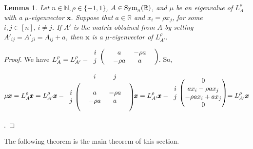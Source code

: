 \documentclass{amsart}
\newtheorem{lemma}[theorem]{Lemma}
\theoremstyle{remark}
\begin{document}
\begin{lemma}\label{edgeprin2}
Let  $n\in \mathbb{N}, \rho\in \{-1,1\}$, $A\in \text{\rm Sym}_{n}(\mathbb{R})$, and $\mu$ be  an  eigenvalue  of  $L_{A}^{\rho}$  with a $\mu$-eigenvector  $\pmb{x}$. Suppose that $a\in \mathbb{R}$ and  $x_{i}=\rho x_{j}$, for some $i,j\in [n],\, i\neq j$. If $A'$  is the  matrix  obtained  from  $A$ by setting  $A'_{ij}=A'_{ji}=A_{ij}+a$,  then $\pmb{x}$ is a $\mu$-eigenvector   of  $L_{A'}^{\rho}$.
\end{lemma} 
\begin{proof}
We have {\footnotesize ${L_{A}^{\rho}}=
{L_{A'}^{\rho}}-
\begin{blockarray}{ccccc}
\begin{block}{c(cccc)}
i &   & a      & -\rho a  &   \\
j &  &  -\rho a       & a  &  \\
\end{block}
\end{blockarray}$.} So,\\
{\footnotesize
$
\mu\pmb{x}={L_{A}^{\rho}}\pmb{x}=
{L_{A'}^{\rho}}\pmb{x}-
\begin{blockarray}{ccccc}
 & &i&j& \\
\begin{block}{c(cccc)}
 & &    &  &  \\
i &   & a      & -\rho a  &   \\
j &  &  -\rho a       & a  &  \\
  & &      &      &  \\
\end{block}
\end{blockarray}\,\pmb{x}=
{L_{A'}^{\rho}}\pmb{x}-
\begin{blockarray}{cc}
\begin{block}{c(c)}
 & 0 \\
i & a x_i-\rho a x_j      \\
j & - \rho a  x_i+ a x_j  \\
  & 0 \\
\end{block}
\end{blockarray}=
{L_{A'}^{\rho}}\pmb{x}$.}
\end{proof}


The following theorem is the main theorem of this section.
\end{document}
